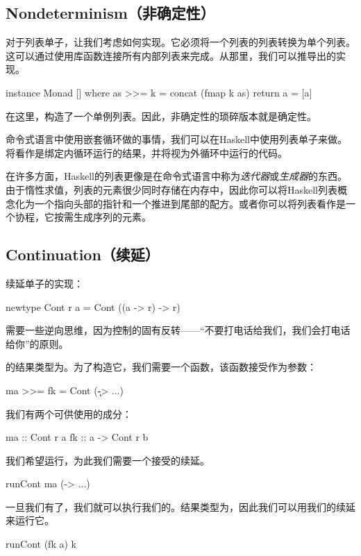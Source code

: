 \documentclass[DaoFP]{subfiles}
\begin{document}
    \subsection{Nondeterminism（非确定性）}

    对于列表单子，让我们考虑如何实现。它必须将一个列表的列表转换为单个列表。这可以通过使用库函数连接所有内部列表来完成。从那里，我们可以推导出的实现。
    \begin{haskell}
        instance Monad [] where
        as >>= k = concat (fmap k as)
        return a = [a]
    \end{haskell}
    在这里，构造了一个单例列表。因此，非确定性的琐碎版本就是确定性。

    命令式语言中使用嵌套循环做的事情，我们可以在Haskell中使用列表单子来做。将看作是绑定内循环运行的结果，并将视为外循环中运行的代码。

    在许多方面，Haskell的列表更像是在命令式语言中称为\emph{迭代器}或\emph{生成器}的东西。由于惰性求值，列表的元素很少同时存储在内存中，因此你可以将Haskell列表概念化为一个指向头部的指针和一个推进到尾部的配方。或者你可以将列表看作是一个协程，它按需生成序列的元素。

    \subsection{Continuation（续延）}

    续延单子的实现：

    \begin{haskell}
        newtype Cont r a = Cont ((a -> r) -> r)
    \end{haskell}
    需要一些逆向思维，因为控制的固有反转——“不要打电话给我们，我们会打电话给你”的原则。

    的结果类型为。为了构造它，我们需要一个函数，该函数接受作为参数：
    \begin{haskell}
        ma >>= fk = Cont (\k -> ...)
    \end{haskell}
    我们有两个可供使用的成分：
    \begin{haskell}
        ma :: Cont r a
        fk :: a -> Cont r b
    \end{haskell}
    我们希望运行，为此我们需要一个接受的续延。
    \begin{haskell}
        runCont ma (\a -> ...)
    \end{haskell}
    一旦我们有了，我们就可以执行我们的。结果类型为，因此我们可以用我们的续延来运行它。
    \begin{haskell}
        runCont (fk a) k
    \end{haskell}
\end{document}
